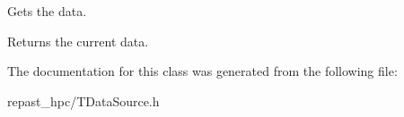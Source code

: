 Gets the data. 

\begin{DoxyReturn}{Returns}
the current data. 
\end{DoxyReturn}


The documentation for this class was generated from the following file\-:\begin{DoxyCompactItemize}
\item 
repast\-\_\-hpc/T\-Data\-Source.\-h\end{DoxyCompactItemize}
